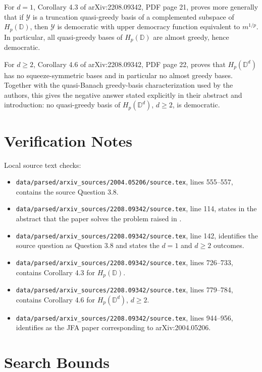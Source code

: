 \documentclass[11pt]{article}
\begin{document}
For \(d=1\), Corollary 4.3 of arXiv:2208.09342, PDF page 21, proves more
generally that if \(\mathcal Y\) is a truncation quasi-greedy basis of a
complemented subspace of \(H_p(\mathbb D)\), then \(\mathcal Y\) is democratic
with upper democracy function equivalent to \(m^{1/p}\). In particular, all
quasi-greedy bases of \(H_p(\mathbb D)\) are almost greedy, hence democratic.

For \(d\ge2\), Corollary 4.6 of arXiv:2208.09342, PDF page 22, proves that
\(H_p(\mathbb D^d)\) has no squeeze-symmetric bases and in particular no
almost greedy bases. Together with the quasi-Banach greedy-basis
characterization used by the authors, this gives the negative answer stated
explicitly in their abstract and introduction: no quasi-greedy basis of
\(H_p(\mathbb D^d)\), \(d\ge2\), is democratic.

\section*{Verification Notes}

Local source text checks:
\begin{itemize}
\item \texttt{data/parsed/arxiv\_sources/2004.05206/source.tex}, lines
555--557, contains the source Question 3.8.
\item \texttt{data/parsed/arxiv\_sources/2208.09342/source.tex}, line 114,
states in the abstract that the paper solves the problem raised in
\cite{AAW2021}.
\item \texttt{data/parsed/arxiv\_sources/2208.09342/source.tex}, line 142,
identifies the source question as Question 3.8 and states the \(d=1\) and
\(d\ge2\) outcomes.
\item \texttt{data/parsed/arxiv\_sources/2208.09342/source.tex}, lines
726--733, contains Corollary 4.3 for \(H_p(\mathbb D)\).
\item \texttt{data/parsed/arxiv\_sources/2208.09342/source.tex}, lines
779--784, contains Corollary 4.6 for \(H_p(\mathbb D^d)\), \(d\ge2\).
\item \texttt{data/parsed/arxiv\_sources/2208.09342/source.tex}, lines
944--956, identifies \cite{AAW2021} as the JFA paper corresponding to
arXiv:2004.05206.
\end{itemize}

\section*{Search Bounds}
\end{document}
